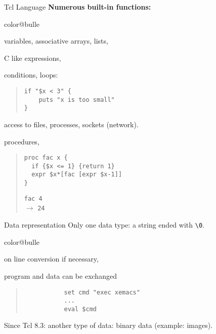 \documentclass[a4paper,landscape,smooth]{show}
\newcommand{\tclex}[2]{\texttt{#1}\\$\rightarrow$ \texttt{#2}}
\begin{document}

\begin{tslide}{Tcl Language}
   \vfill
   {\bf Numerous built-in functions:}
   \begin{bitemize}{color@bulle}

      \item variables, associative arrays, lists,
      \item C like expressions,
      \item conditions, loops:
	 \begin{quote}
	    \begin{verbatim}
if "$x < 3" {
    puts "x is too small"
}
	    \end{verbatim} %
	 \end{quote}
      \item access to files, processes, sockets (network).
      \item procedures,
	 \begin{quote}
	    \begin{verbatim}
proc fac x {
  if {$x <= 1} {return 1}
  expr $x*[fac [expr $x-1]]
}
	     \end{verbatim} %
	    \vspace{2ex}
	    \tclex{fac 4}{24}
	 \end{quote}

   \end{bitemize}
   \vfill
\end{tslide}


\begin{tslide}{Data representation}
   \vfill
   Only one data type: a string ended with
   \verb|\0|.
   \begin{bitemize}{color@bulle}
      \item on line conversion if necessary,
      \item program and data can be exchanged
	 \begin{quote}
	    \begin{verbatim}
	       set cmd "exec xemacs"
	       ...
	       eval $cmd
	    \end{verbatim} %
	 \end{quote}
   \end{bitemize}

   Since Tcl 8.3: another type of data: binary data (example: images). 
   \vfill
\end{tslide}
\end{document}

